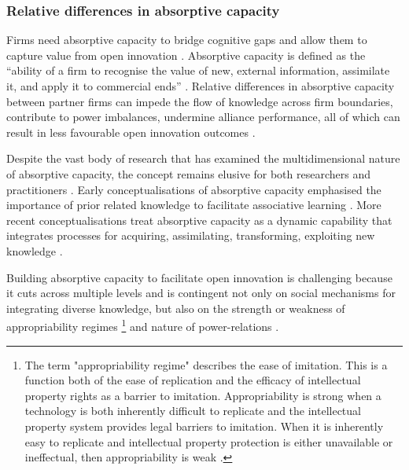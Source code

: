 \subsubsection{Relative differences in absorptive capacity}

Firms need absorptive capacity to bridge cognitive gaps and allow them to capture value from open innovation \citep{vanhaverbeke2007connecting}. Absorptive capacity is defined as the \enquote{ability of a firm to recognise the value of new, external information, assimilate it, and apply it to commercial ends} \citep{cohen1990absorptive}. Relative differences in absorptive capacity between partner firms can impede the flow of knowledge across firm boundaries, contribute to power imbalances, undermine alliance performance, all of which can result in less favourable open innovation outcomes \citep{szulanski1996exploring,lane1998relative,nooteboom2000learning,vanhaverbeke2007connecting,easterby2008absorptive,phelps2012knowledge} \medskip.
 
Despite the vast body of research that has examined the multidimensional nature of absorptive capacity, the concept remains elusive for both researchers and practitioners \citep{duchek2013capturing,omidvar2013revisiting}. Early conceptualisations of absorptive capacity emphasised the importance of prior related knowledge to facilitate associative learning \citep{cohen1990absorptive}. More recent conceptualisations treat absorptive capacity as a dynamic capability that integrates processes for acquiring, assimilating, transforming, exploiting new knowledge \citep{zahra2002absorptive,todorova2007absorptive,volberda2010perspective,lewin2011microfoundations,marabelli2014knowing}. \medskip

Building absorptive capacity to facilitate open innovation is challenging because it cuts across multiple levels and is contingent not only on social mechanisms for integrating diverse knowledge, but also on the strength or weakness of appropriability regimes \footnote{The term "appropriability regime" describes the ease of imitation. This is a function both of the ease of replication and the efficacy of intellectual property rights as a barrier to imitation. Appropriability is strong when a technology is both inherently difficult to replicate and the intellectual property system provides legal barriers to imitation. When it is inherently easy to replicate and intellectual property protection is either unavailable or ineffectual, then appropriability is weak \citep{teece1998capturing}.} and nature of power-relations \citep{todorova2007absorptive,easterby2008absorptive,duchek2013capturing}. \medskip 

